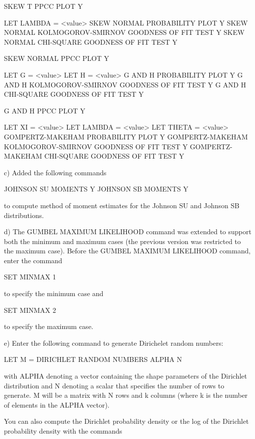 {           SKEW T PPCC PLOT Y

           LET LAMBDA = <value>
           SKEW NORMAL PROBABILITY PLOT Y
           SKEW NORMAL KOLMOGOROV-SMIRNOV GOODNESS OF FIT TEST Y
           SKEW NORMAL CHI-SQUARE GOODNESS OF FIT TEST Y

           SKEW NORMAL PPCC PLOT Y

           LET G = <value>
           LET H = <value>
           G AND H PROBABILITY PLOT Y
           G AND H KOLMOGOROV-SMIRNOV GOODNESS OF FIT TEST Y
           G AND H CHI-SQUARE GOODNESS OF FIT TEST Y

           G AND H PPCC PLOT Y

           LET XI = <value>
           LET LAMBDA = <value>
           LET THETA = <value>
           GOMPERTZ-MAKEHAM PROBABILITY PLOT Y
           GOMPERTZ-MAKEHAM KOLMOGOROV-SMIRNOV GOODNESS OF FIT TEST Y
           GOMPERTZ-MAKEHAM CHI-SQUARE GOODNESS OF FIT TEST Y

    c) Added the following commands

          JOHNSON SU MOMENTS Y
          JOHNSON SB MOMENTS Y

       to compute method of moment estimates for the Johnson SU
       and Johnson SB distributions.

    d) The GUMBEL MAXIMUM LIKELIHOOD command was extended to support
       both the minimum and maximum cases (the previous version was
       restricted to the maximum case).  Before the GUMBEL MAXIMUM
       LIKELIHOOD command, enter the command

          SET MINMAX 1

       to specify the minimum case and 

          SET MINMAX 2

       to specify the maximum case.

    e) Enter the following command to generate Dirichelet random numbers:

          LET M = DIRICHLET RANDOM NUMBERS ALPHA N

       with ALPHA denoting a vector containing the shape parameters of
       the Dirichlet distribution and N denoting a scalar that specifies
       the number of rows to generate.  M will be a matrix with N rows
       and k columns (where k is the number of elements in the ALPHA
       vector).

       You can also compute the Dirichlet probability density or the
       log of the Dirichlet probability density with the commands

}
